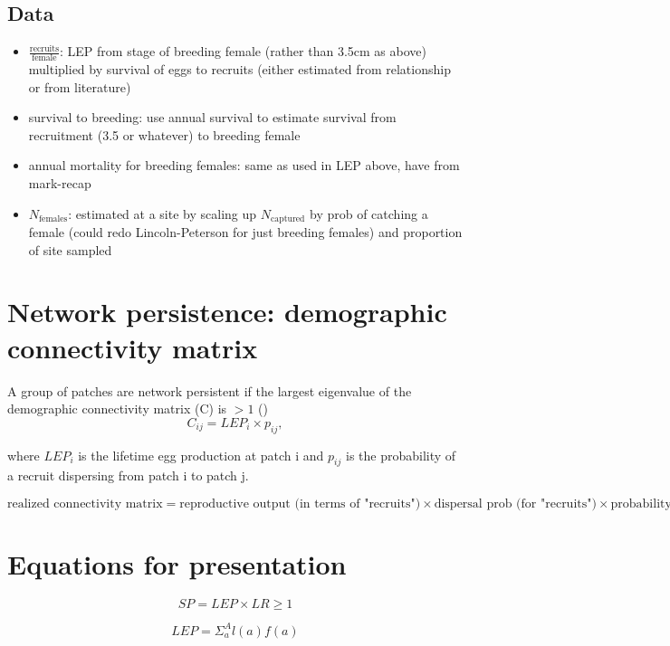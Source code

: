 \documentclass[12pt, oneside]{article}   	%
\begin{document}
\subsection*{Data}
\begin{itemize}
	\item $\frac{\text{recruits}}{\text{female}}$: LEP from stage of breeding female (rather than 3.5cm as above) multiplied by survival of eggs to recruits (either estimated from relationship or from literature)
	\item survival to breeding: use annual survival to estimate survival from recruitment (3.5 or whatever) to breeding female
	\item annual mortality for breeding females: same as used in LEP above, have from mark-recap
	\item $N_{\text{females}}$: estimated at a site by scaling up $N_{\text{captured}}$ by prob of catching a female (could redo Lincoln-Peterson for just breeding females) and proportion of site sampled
	\end{itemize}

\section*{Network persistence: demographic connectivity matrix}
A group of patches are network persistent if the largest eigenvalue of the demographic connectivity matrix (C) is $ > 1$ (\cite{burgess2014beyond,lyselpopulation})
\begin{equation}
C_{ij} = LEP_i \times p_{ij},
\end{equation}

where $LEP_i$ is the lifetime egg production at patch i and $p_{ij}$ is the probability of a recruit dispersing from patch i to patch j.

\begin{equation}
\text{realized connectivity matrix} = \text{reproductive output (in terms of "recruits")} \times \text{dispersal prob (for "recruits")} \times \text{probability of survival to maturity for females}
\end{equation}

\section*{Equations for presentation}
\begin{equation}
SP = LEP \times LR \geq 1
\end{equation}

\begin{equation}
LEP = \Sigma_a^A l(a)f(a)
\end{equation}
\end{document}
